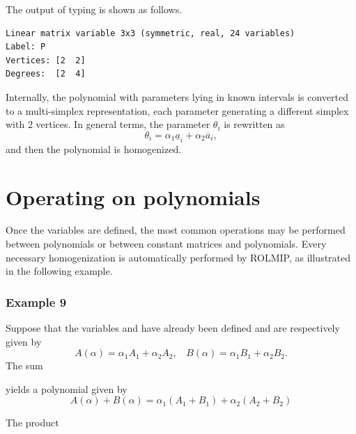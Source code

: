 \documentclass[english,11pt]{article}
\theoremstyle{break} \theorembodyfont{\small\rm}
\begin{document}
The output of typing  is shown as follows.

\begin{minipage}{13.5cm}
\begin{lstlisting}[rulecolor=\color{red}]
Linear matrix variable 3x3 (symmetric, real, 24 variables)
Label: P
Vertices: [2  2]
Degrees:  [2  4]
\end{lstlisting}
\end{minipage}
\vspace{0.2cm}


Internally, the polynomial with parameters lying in known intervals is converted to a multi-simplex representation, 
each parameter generating a different simplex with $2$ vertices. In general terms, the parameter $\theta_i$ is rewritten as
\[
 \theta_i = \alpha_1 \underline{a}_i + \alpha_2 \overline{a}_i,
\]
and then the polynomial is homogenized. 



 
 
\section{Operating on polynomials}\label{sec_parser_poly}

Once the  variables are defined, the most common operations may be performed between
polynomials or between constant matrices and polynomials. Every necessary homogenization is automatically
performed by ROLMIP, as illustrated in the following example.

\subsubsection*{Example 9}
Suppose that the  variables  and  have already been defined and
are respectively given by
\[
 A(\alpha) = \alpha_1 A_1 + \alpha_2 A_2, ~ ~ ~ ~  B(\alpha) = \alpha_1 B_1 + \alpha_2 B_2.
\]
The sum

\begin{minipage}{12.5cm}
\end{minipage}

yields a polynomial given by
\[
 A(\alpha) + B(\alpha) = \alpha_1 (A_1 + B_1) + \alpha_2 (A_2 + B_2)
\]

The product 

\begin{minipage}{12.5cm}
\end{minipage}
\end{document}
